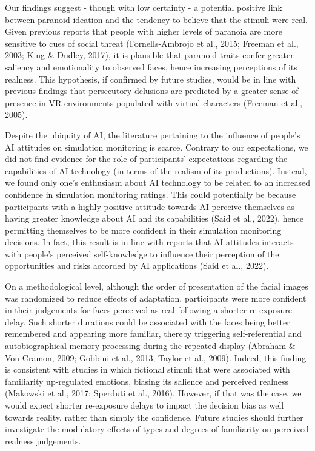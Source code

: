 \documentclass[
  man,floatsintext]{apa6}
\begin{document}
Our findings suggest - though with low certainty - a potential positive link between paranoid ideation and the tendency to believe that the stimuli were real. Given previous reports that people with higher levels of paranoia are more sensitive to cues of social threat (Fornells-Ambrojo et al., 2015; Freeman et al., 2003; King \& Dudley, 2017), it is plausible that paranoid traits confer greater saliency and emotionality to observed faces, hence increasing perceptions of its realness. This hypothesis, if confirmed by future studies, would be in line with previous findings that persecutory delusions are predicted by a greater sense of presence in VR environments populated with virtual characters (Freeman et al., 2005).

Despite the ubiquity of AI, the literature pertaining to the influence of people's AI attitudes on simulation monitoring is scarce. Contrary to our expectations, we did not find evidence for the role of participants' expectations regarding the capabilities of AI technology (in terms of the realism of its productions). Instead, we found only one's enthusiasm about AI technology to be related to an increased confidence in simulation monitoring ratings. This could potentially be because participants with a highly positive attitude towards AI perceive themselves as having greater knowledge about AI and its capabilities (Said et al., 2022), hence permitting themselves to be more confident in their simulation monitoring decisions. In fact, this result is in line with reports that AI attitudes interacts with people's perceived self-knowledge to influence their perception of the opportunities and risks accorded by AI applications (Said et al., 2022).

On a methodological level, although the order of presentation of the facial images was randomized to reduce effects of adaptation, participants were more confident in their judgements for faces perceived as real following a shorter re-exposure delay. Such shorter durations could be associated with the faces being better remembered and appearing more familiar, thereby triggering self-referential and autobiographical memory processing during the repeated display (Abraham \& Von Cramon, 2009; Gobbini et al., 2013; Taylor et al., 2009). Indeed, this finding is consistent with studies in which fictional stimuli that were associated with familiarity up-regulated emotions, biasing its salience and perceived realness (Makowski et al., 2017; Sperduti et al., 2016). However, if that was the case, we would expect shorter re-exposure delays to impact the decision bias as well towards reality, rather than simply the confidence. Future studies should further investigate the modulatory effects of types and degrees of familiarity on perceived realness judgements.
\end{document}
